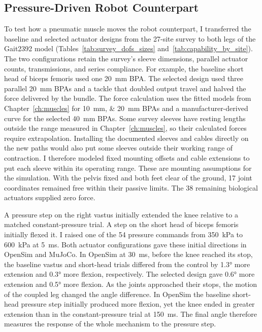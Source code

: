 \subsection{Pressure-Driven Robot Counterpart}\label{sec:app_robotbody_pressure}
To test how a pneumatic muscle moves the robot counterpart, I transferred the baseline and selected actuator designs from the 27-site survey to both legs of the Gait2392 model (Tables~\ref{tab:survey_dofs_sizes} and~\ref{tab:capability_by_site}). The two configurations retain the survey's sleeve dimensions, parallel actuator counts, transmissions, and series compliance. For example, the baseline short head of biceps femoris used one \qty{20}{\milli\meter} BPA. The selected design used three parallel \qty{20}{\milli\meter} BPAs and a tackle that doubled output travel and halved the force delivered by the bundle. The force calculation uses the fitted models from Chapter~\ref{ch:muscles} for \qtylist{10;20}{\milli\meter} BPAs and a manufacturer-derived curve for the selected \qty{40}{\milli\meter} BPAs. Some survey sleeves have resting lengths outside the range measured in Chapter~\ref{ch:muscles}, so their calculated forces require extrapolation. Installing the documented sleeves and cables directly on the new paths would also put some sleeves outside their working range of contraction. I therefore modeled fixed mounting offsets and cable extensions to put each sleeve within its operating range. These are mounting assumptions for the simulation. With the pelvis fixed and both feet clear of the ground, 17 joint coordinates remained free within their passive limits. The 38 remaining biological actuators supplied zero force.

A pressure step on the right vastus initially extended the knee relative to a matched constant-pressure trial. A step on the short head of biceps femoris initially flexed it. I raised one of the 54 pressure commands from \qty{350}{\kPa} to \qty{600}{\kPa} at \qty{5}{\milli\second}. Both actuator configurations gave these initial directions in OpenSim and MuJoCo. In OpenSim at \qty{30}{\milli\second}, before the knee reached its stop, the baseline vastus and short-head trials differed from the control by \ang{1.3} more extension and \ang{0.3} more flexion, respectively. The selected design gave \ang{0.6} more extension and \ang{0.5} more flexion. As the joints approached their stops, the motion of the coupled leg changed the angle difference. In OpenSim the baseline short-head pressure step initially produced more flexion, yet the knee ended in greater extension than in the constant-pressure trial at \qty{150}{\milli\second}. The final angle therefore measures the response of the whole mechanism to the pressure step.

